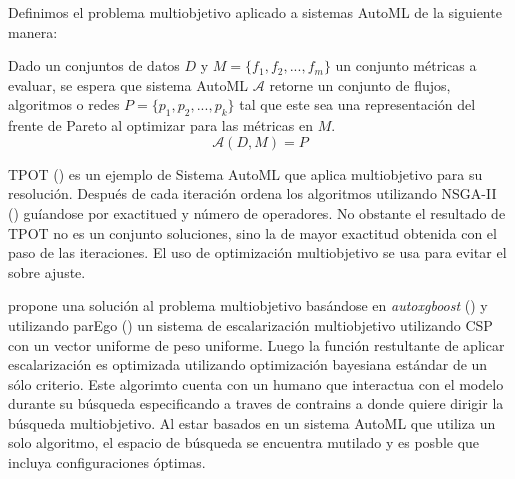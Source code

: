 Definimos el problema multiobjetivo aplicado a sistemas AutoML de la siguiente manera:
\begin{definition}
    Dado un conjuntos de datos $D$ y  $M = \{f_1, f_2, ...,f_m\}$ un conjunto m\'etricas a evaluar, se espera que sistema AutoML $\mathcal{A}$ retorne un conjunto de flujos, algoritmos o redes $P = \{p_1, p_2, ..., p_k\}$ tal que este sea una representaci\'on del frente de Pareto al optimizar para las m\'etricas en $M$.
    \begin{equation*}
        \mathcal{A}(D, M) = P  
    \end{equation*}
\end{definition}

TPOT (\cite{pmlr-v64-olson_tpot_2016}) es un ejemplo de Sistema AutoML que aplica multiobjetivo para su resoluci\'on. Despu\'es de cada iteraci\'on ordena los algoritmos utilizando NSGA-II (\cite{deb2002fast}) gu\'iandose por exactitued y n\'umero de operadores. No obstante el resultado de TPOT no es un conjunto soluciones, sino la de mayor exactitud obtenida con el paso de las iteraciones. El uso de optimizaci\'on multiobjetivo se usa para evitar el sobre ajuste.

\cite{pfisterer2019multi} propone una soluci\'on al problema multiobjetivo bas\'andose en \textit{autoxgboost} (\cite{thomas2018automatic}) y utilizando  parEgo (\cite{knowles2006parego}) un sistema de escalarizaci\'on multiobjetivo utilizando CSP con un vector uniforme de peso uniforme. Luego la funci\'on restultante de aplicar escalarizaci\'on es optimizada utilizando optimizaci\'on bayesiana est\'andar de un s\'olo criterio.
Este algorimto cuenta con un humano que interactua con el modelo durante su b\'usqueda especificando a traves de contrains a donde quiere dirigir la b\'usqueda multiobjetivo.
Al estar basados en un sistema AutoML que utiliza un solo algoritmo, el espacio de b\'usqueda se encuentra mutilado y es posble que incluya configuraciones \'optimas.




